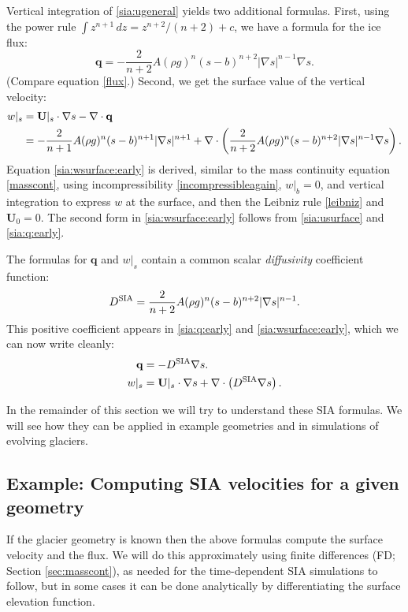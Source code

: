 \documentclass[letterpaper,final,12pt,reqno]{amsart}
\newcommand{\bq}{\mathbf{q}}
\newcommand{\bU}{\mathbf{U}}
\newcommand{\grad}{\nabla}
\newcommand{\Div}{\nabla\cdot}
\newcommand{\Dsia}{D^{\text{\textrm{SIA}}}}
\begin{document}
Vertical integration of \eqref{sia:ugeneral} yields two additional formulas.  First, using the power rule $\int z^{n+1}\,dz = z^{n+2}/(n+2) + c$, we have a formula for the ice flux:
\begin{equation}
\bq = - \frac{2}{n+2} A (\rho g)^n (s-b)^{n+2} |\grad s|^{n-1} \grad s. \label{sia:q:early}
\end{equation}
(Compare equation \eqref{flux}.)  Second, we get the surface value of the vertical velocity:
\begin{align}
w|_s &= \bU|_s \cdot \grad s - \Div \bq   \label{sia:wsurface:early} \\
  &= - \frac{2}{n+1} A (\rho g)^n (s-b)^{n+1} |\grad s|^{n+1} + \Div \left(\frac{2}{n+2} A (\rho g)^n (s-b)^{n+2} |\grad s|^{n-1} \grad s\right).  \notag
\end{align}
Equation \eqref{sia:wsurface:early} is derived, similar to the mass continuity equation \eqref{masscont}, using incompressibility \eqref{incompressibleagain}, $w|_b=0$, and vertical integration to express $w$ at the surface, and then the Leibniz rule \eqref{leibniz} and $\bU_0=0$.  The second form in \eqref{sia:wsurface:early} follows from \eqref{sia:usurface} and \eqref{sia:q:early}.

The formulas for $\bq$ and $w|_s$ contain a common scalar \emph{diffusivity} coefficient function:
\begin{equation}
\Dsia = \frac{2}{n+2} A (\rho g)^n (s-b)^{n+2} |\grad s|^{n-1}. \label{sia:D}
\end{equation}
This positive coefficient appears in \eqref{sia:q:early} and \eqref{sia:wsurface:early}, which we can now write cleanly:
\begin{align}
\bq  &= - \Dsia \grad s. \label{sia:q} \\
w|_s &= \bU|_s \cdot \grad s + \Div \left(\Dsia \grad s\right).  \label{sia:wsurface}
\end{align}

In the remainder of this section we will try to understand these SIA formulas.  We will see how they can be applied in example geometries and in simulations of evolving glaciers.

\subsection*{Example: Computing SIA velocities for a given geometry}    If the glacier geometry is known then the above formulas compute the surface velocity and the flux.  We will do this approximately using finite differences (FD; Section \ref{sec:masscont}), as needed for the time-dependent SIA simulations to follow, but in some cases it can be done analytically by differentiating the surface elevation function.
\end{document}
